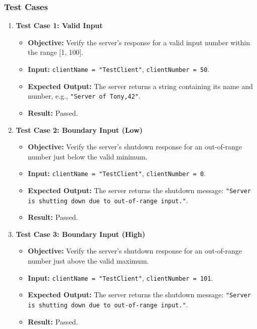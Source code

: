\documentclass{article}
\begin{document}
\subsubsection{Test Cases}
\begin{enumerate}
    \item \textbf{Test Case 1: Valid Input}
    \begin{itemize}
        \item \textbf{Objective:} Verify the server's response for a valid input number within the range [1, 100].
        \item \textbf{Input:} \texttt{clientName = "TestClient"}, \texttt{clientNumber = 50}.
        \item \textbf{Expected Output:} The server returns a string containing its name and number, e.g., \texttt{"Server of Tony,42"}.
        \item \textbf{Result:} Passed.
    \end{itemize}
    \item \textbf{Test Case 2: Boundary Input (Low)}
    \begin{itemize}
        \item \textbf{Objective:} Verify the server's shutdown response for an out-of-range number just below the valid minimum.
        \item \textbf{Input:} \texttt{clientName = "TestClient"}, \texttt{clientNumber = 0}.
        \item \textbf{Expected Output:} The server returns the shutdown message: \texttt{"Server is shutting down due to out-of-range input."}.
        \item \textbf{Result:} Passed.
    \end{itemize}
    \item \textbf{Test Case 3: Boundary Input (High)}
    \begin{itemize}
        \item \textbf{Objective:} Verify the server's shutdown response for an out-of-range number just above the valid maximum.
        \item \textbf{Input:} \texttt{clientName = "TestClient"}, \texttt{clientNumber = 101}.
        \item \textbf{Expected Output:} The server returns the shutdown message: \texttt{"Server is shutting down due to out-of-range input."}.
        \item \textbf{Result:} Passed.
    \end{itemize}
\end{enumerate}
\end{document}
